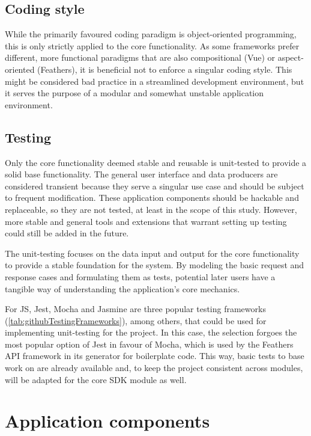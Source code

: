 \subsection{Coding style}

While the primarily favoured coding paradigm is object-oriented programming, this is only strictly applied to the core functionality. As some frameworks prefer different, more functional paradigms that are also compositional (Vue) or aspect-oriented (Feathers), it is beneficial not to enforce a singular coding style. This might be considered bad practice in a streamlined development environment, but it serves the purpose of a modular and somewhat unstable  application environment.

\subsection{Testing}

Only the core functionality deemed stable and reusable is unit-tested to provide a solid base functionality. The general user interface and data producers are considered transient because they serve a singular use case and should be subject to frequent modification. These application components should be hackable and replaceable, so they are not tested, at least in the scope of this study. However, more stable and general tools and extensions that warrant setting up testing could still be added in the future.

The unit-testing focuses on the data input and output for the core functionality to provide a stable foundation for the system. By modeling the basic request and response cases and formulating them as tests, potential later users have a tangible way of understanding the application's core mechanics.

For \ac{JS}, Jest, Mocha and Jasmine are three popular testing frameworks (\ref{tab:githubTestingFrameworks}), among others, that could be used for implementing unit-testing for the project. In this case, the selection forgoes the most popular option of Jest in favour of Mocha, which is used by the Feathers \ac{API} framework in its generator for boilerplate code. This way, basic tests to base work on are already available and, to keep the project consistent across modules, will be adapted for the core \ac{SDK} module as well.



\section{Application components}

